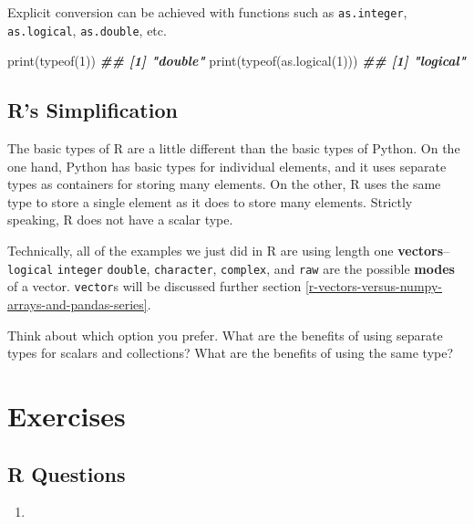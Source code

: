 \documentclass[
  12pt,
  krantz2]{krantz}
\makeatletter
\newenvironment{Shaded}{\begin{snugshade}}{\end{snugshade}}
\newcommand{\DecValTok}[1]{\textcolor[rgb]{0.06,0.06,0.06}{#1}}
\newcommand{\DocumentationTok}[1]{\textcolor[rgb]{0.37,0.37,0.37}{\textbf{\textit{#1}}}}
\newcommand{\FunctionTok}[1]{\textcolor[rgb]{0,0,0}{#1}}
\newcommand{\NormalTok}[1]{#1}
\providecommand{\tightlist}{%
  \setlength{\itemsep}{0pt}\setlength{\parskip}{0pt}}
\newenvironment{kframe}{%
\medskip{}
\setlength{\fboxsep}{.8em}
 \def\at@end@of@kframe{}%
 \ifinner\ifhmode%
  \def\at@end@of@kframe{\end{minipage}}%
  \begin{minipage}{\columnwidth}%
 \fi\fi%
 \def\FrameCommand##1{\hskip\@totalleftmargin \hskip-\fboxsep
 \colorbox{shadecolor}{##1}\hskip-\fboxsep
     \hskip-\linewidth \hskip-\@totalleftmargin \hskip\columnwidth}%
 \MakeFramed {\advance\hsize-\width
   \@totalleftmargin\z@ \linewidth\hsize
   \@setminipage}}%
 {\par\unskip\endMakeFramed%
 \at@end@of@kframe}
\renewenvironment{Shaded}{\begin{kframe}}{\end{kframe}}
\makeatother
\begin{document}
Explicit conversion can be achieved with functions such as \texttt{as.integer}, \texttt{as.logical}, \texttt{as.double}, etc.

\begin{Shaded}
\begin{Highlighting}[]
\FunctionTok{print}\NormalTok{(}\FunctionTok{typeof}\NormalTok{(}\DecValTok{1}\NormalTok{))}
\DocumentationTok{\#\# [1] "double"}
\FunctionTok{print}\NormalTok{(}\FunctionTok{typeof}\NormalTok{(}\FunctionTok{as.logical}\NormalTok{(}\DecValTok{1}\NormalTok{)))}
\DocumentationTok{\#\# [1] "logical"}
\end{Highlighting}
\end{Shaded}

\hypertarget{rs-simplification}{%
\subsection{R's Simplification}\label{rs-simplification}}

The basic types of R are a little different than the basic types of Python. On the one hand, Python has basic types for individual elements, and it uses separate types as containers for storing many elements. On the other, R uses the same type to store a single element as it does to store many elements. Strictly speaking, R does not have a scalar type.

Technically, all of the examples we just did in R are using length one \textbf{vectors}--\texttt{logical} \texttt{integer} \texttt{double}, \texttt{character}, \texttt{complex}, and \texttt{raw} are the possible \textbf{modes} of a vector. \texttt{vector}s will be discussed further section \ref{r-vectors-versus-numpy-arrays-and-pandas-series}.

Think about which option you prefer. What are the benefits of using separate types for scalars and collections? What are the benefits of using the same type?

\hypertarget{exercises}{%
\section{Exercises}\label{exercises}}

\hypertarget{r-questions}{%
\subsection{R Questions}\label{r-questions}}

\begin{enumerate}
\def\labelenumi{\arabic{enumi}.}
\tightlist
\item
\end{enumerate}
\end{document}
